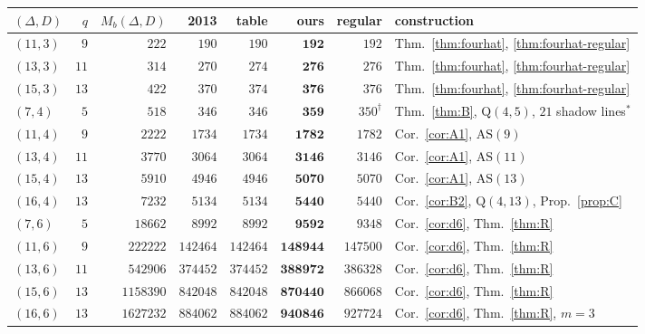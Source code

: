 \documentclass[11pt]{amsart}
\theoremstyle{definition}
\theoremstyle{remark}
\newcommand{\AS}{\mathrm{AS}}
\newcommand{\Qf}{\mathrm{Q}}
\begin{document}
\begin{table}[ht]
\centering\small
\renewcommand{\arraystretch}{1.12}
\begin{tabular}{@{}lrrrrrrl@{}}
\toprule
$(\Delta,D)$ & $q$ & $M_b(\Delta,D)$ & 2013 \cite{MS13} & table \cite{CW} & ours & regular & construction\\
\midrule
$(11,3)$ & $9$ & $222$ & $190$ & $190$ & $\mathbf{192}$ & $192$ & Thm.~\ref{thm:fourhat}, \ref{thm:fourhat-regular}\\
$(13,3)$ & $11$ & $314$ & $270$ & $274$ & $\mathbf{276}$ & $276$ & Thm.~\ref{thm:fourhat}, \ref{thm:fourhat-regular}\\
$(15,3)$ & $13$ & $422$ & $370$ & $374$ & $\mathbf{376}$ & $376$ & Thm.~\ref{thm:fourhat}, \ref{thm:fourhat-regular}\\
\midrule
$(7,4)$ & $5$ & $518$ & $346$ & $346$ & $\mathbf{359}$ & $350^{\dagger}$ & Thm.~\ref{thm:B}, $\Qf(4,5)$, $21$ shadow lines$^{*}$\\
$(11,4)$ & $9$ & $2222$ & $1734$ & $1734$ & $\mathbf{1782}$ & $1782$ & Cor.~\ref{cor:A1}, $\AS(9)$\\
$(13,4)$ & $11$ & $3770$ & $3064$ & $3064$ & $\mathbf{3146}$ & $3146$ & Cor.~\ref{cor:A1}, $\AS(11)$\\
$(15,4)$ & $13$ & $5910$ & $4946$ & $4946$ & $\mathbf{5070}$ & $5070$ & Cor.~\ref{cor:A1}, $\AS(13)$\\
$(16,4)$ & $13$ & $7232$ & $5134$ & $5134$ & $\mathbf{5440}$ & $5440$ & Cor.~\ref{cor:B2}, $\Qf(4,13)$, Prop.~\ref{prop:C}\\
\midrule
$(7,6)$ & $5$ & $18662$ & $8992$ & $8992$ & $\mathbf{9592}$ & $9348$ & Cor.~\ref{cor:d6}, Thm.~\ref{thm:R}\\
$(11,6)$ & $9$ & $222222$ & $142464$ & $142464$ & $\mathbf{148944}$ & $147500$ & Cor.~\ref{cor:d6}, Thm.~\ref{thm:R}\\
$(13,6)$ & $11$ & $542906$ & $374452$ & $374452$ & $\mathbf{388972}$ & $386328$ & Cor.~\ref{cor:d6}, Thm.~\ref{thm:R}\\
$(15,6)$ & $13$ & $1158390$ & $842048$ & $842048$ & $\mathbf{870440}$ & $866068$ & Cor.~\ref{cor:d6}, Thm.~\ref{thm:R}\\
$(16,6)$ & $13$ & $1627232$ & $884062$ & $884062$ & $\mathbf{940846}$ & $927724$ & Cor.~\ref{cor:d6}, Thm.~\ref{thm:R}, $m=3$\\
\bottomrule
\end{tabular}

\end{table}
\end{document}
